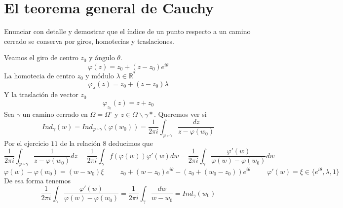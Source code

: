 \section{El teorema general de Cauchy}

\begin{ejer}
	Enunciar con detalle y demostrar que el índice de un punto respecto a un camino cerrado
	se conserva por giros, homotecias y traslaciones.
\end{ejer}

\begin{sol}
	Veamos el giro de centro $z_0$ y ángulo $\theta$.
	$$\varphi(z) = z_0 + (z-z_0)e^{i\theta}$$
	La homotecia de centro $z_0$ y módulo $\lambda\in\mathbb{R}^{\ast}$
	$$\varphi_{\lambda}(z) = z_0 + (z-z_0)\lambda$$
	Y la traslación de vector $z_0$
	$$\varphi_{z_0} (z) = z+z_0$$
	Sea $\gamma$ un camino cerrado en $\Omega=\Omega^{\circ}$
	y $z\in\Omega\backslash\gamma{\ast}$.
	Queremos ver si  $$Ind_{\gamma}(w)=Ind_{\varphi\circ\gamma} (\varphi(w_0)) = \frac{1}{2\pi i} \int_{\varphi\circ\gamma} \frac{dz}{z-\varphi(w_0)}$$ 
	Por el ejercicio $11$ de la relación $8$ deducimos que
	$$\frac{1}{2\pi i} \int_{\varphi\circ\gamma} \frac{1}{z-\varphi(w_0)} dz = \frac{1}{2\pi i} \int_{\gamma} f(\varphi(w))\varphi'(w) dw = \frac{1}{2\pi i} \int_{\gamma} \frac{\varphi'(w)}{\varphi(w)-\varphi(w_0)} dw$$
	$$\varphi(w)-\varphi(w_0) = (w-w_0) \xi \hspace{1cm}
	z_0+(w-z_0)e^{i\theta}-(z_0+(w_0-z_0))e^{i\theta} \hspace{1cm}\varphi'(w) = \xi \in \{ e^{i\theta},\lambda,1 \}$$
	De esa forma tenemos 
	$$\frac{1}{2\pi i} \int_{\gamma} \frac{\varphi'(w)}{\varphi(w)-\varphi(w_0)} = \frac{1}{2\pi i} \int_{\gamma} \frac{dw}{w-w_0} = Ind_{\gamma}(w_0)$$
\end{sol}


